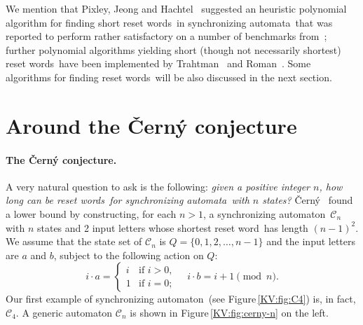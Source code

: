 \documentclass{irmaart}
\newcommand{\sa}{synchronizing au\-tom\-a\-ta}
\newcommand{\san}{synchronizing au\-tom\-a\-ton}
\newcommand{\sw}{reset word}
\newcommand{\sws}{reset words}
\theoremstyle{plain}
\begin{document}
We mention that Pixley, Jeong and Hachtel~\cite{Pixley&Jeong&Hachtel:1992}
suggested an heuristic polynomial algorithm for finding short \sws\ in \sa\
that was reported to perform rather satisfactory on a number of benchmarks
from~\cite{Yang:1991}; further polynomial algorithms yielding short (though not
necessarily shortest) \sws\ have been implemented by
Trahtman~\cite{Trahtman:2006} and Roman~\cite{Roman:2009,Roman:2009a}. Some
algorithms for finding \sws\ will be also discussed in the next section.

\section{Around the \v{C}ern\'{y} conjecture}
\label{KV:sec:Cerny conjecture}
\paragraph*{The \v{C}ern\'{y} conjecture.} A very natural question to ask
is the following: \emph{given a positive integer $n$, how long can be \sws\ for
\sa\ with $n$ states?} \v{C}ern\'{y}~\cite{Cerny:1964} found a lower bound by
constructing, for each $n>1$, a \san\
$\mathcal{C}_n$ with $n$ states and 2 input
letters whose shortest \sw\ has length $(n-1)^2$. We assume that the state set
of $\mathcal{C}_n$ is $Q=\{0,1,2,\dots,n-1\}$ and the input letters are $a$ and
$b$, subject to the following action on $Q$:
\begin{displaymath}
i\cdot a=\begin{cases}
i &\text{if } i>0,\\
1 &\text{if } i=0;
\end{cases}\quad
i\cdot b=i+1\!\!\pmod{n}.
\end{displaymath}
Our first example of \san\ (see Figure\,\ref{KV:fig:C4}) is, in
fact, $\mathcal{C}_4$. A generic automaton $\mathcal{C}_n$ is
shown in Figure\,\ref{KV:fig:cerny-n} on the left.
\end{document}
